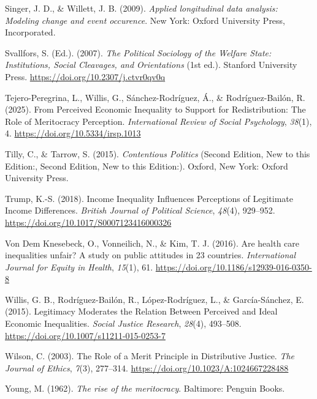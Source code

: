 \documentclass[
  12pt,
]{article}
\newlength{\cslhangindent}
\newlength{\cslentryspacingunit} %
\newenvironment{CSLReferences}[2] %
 {%
  \setlength{\parindent}{0pt}
  \ifodd #1
  \let\oldpar\par
  \def\par{\hangindent=\cslhangindent\oldpar}
  \fi
  \setlength{\parskip}{#2\cslentryspacingunit}
 }%
 {}
\begin{document}
\begin{CSLReferences}{1}{0}
\leavevmode{}%
Singer, J. D., \& Willett, J. B. (2009). \emph{Applied longitudinal data
analysis: Modeling change and event occurence}. New York: Oxford
University Press, Incorporated.

\leavevmode{}%
Svallfors, S. (Ed.). (2007). \emph{The {Political Sociology} of the
{Welfare State}: {Institutions}, {Social Cleavages}, and {Orientations}}
(1st ed.). Stanford University Press.
\url{https://doi.org/10.2307/j.ctvr0qv0q}

\leavevmode{}%
Tejero-Peregrina, L., Willis, G., Sánchez-Rodríguez, Á., \&
Rodríguez-Bailón, R. (2025). From {Perceived Economic Inequality} to
{Support} for {Redistribution}: {The Role} of {Meritocracy Perception}.
\emph{International Review of Social Psychology}, \emph{38}(1), 4.
\url{https://doi.org/10.5334/irsp.1013}

\leavevmode{}%
Tilly, C., \& Tarrow, S. (2015). \emph{Contentious {Politics}} (Second
Edition, New to this Edition:, Second Edition, New to this Edition:).
Oxford, New York: Oxford University Press.

\leavevmode{}%
Trump, K.-S. (2018). Income {Inequality Influences Perceptions} of
{Legitimate Income Differences}. \emph{British Journal of Political
Science}, \emph{48}(4), 929--952.
\url{https://doi.org/10.1017/S0007123416000326}

\leavevmode{}%
Von Dem Knesebeck, O., Vonneilich, N., \& Kim, T. J. (2016). Are health
care inequalities unfair? {A} study on public attitudes in 23 countries.
\emph{International Journal for Equity in Health}, \emph{15}(1), 61.
\url{https://doi.org/10.1186/s12939-016-0350-8}

\leavevmode{}%
Willis, G. B., Rodríguez-Bailón, R., López-Rodríguez, L., \&
García-Sánchez, E. (2015). Legitimacy {Moderates} the {Relation Between
Perceived} and {Ideal Economic Inequalities}. \emph{Social Justice
Research}, \emph{28}(4), 493--508.
\url{https://doi.org/10.1007/s11211-015-0253-7}

\leavevmode{}%
Wilson, C. (2003). The {Role} of a {Merit Principle} in {Distributive
Justice}. \emph{The Journal of Ethics}, \emph{7}(3), 277--314.
\url{https://doi.org/10.1023/A:1024667228488}

\leavevmode{}%
Young, M. (1962). \emph{The rise of the meritocracy}. Baltimore: Penguin
Books.

\end{CSLReferences}
\end{document}
